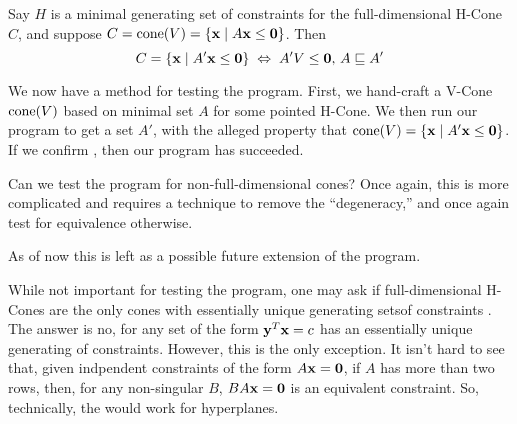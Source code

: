 \begin{EqCriteria}\label{eq_vc_hc}
	Say $H$ is a minimal generating set of constraints for the full-dimensional H-Cone $C$, and suppose $C = \operatorname{cone}(V) = \left\{\mathbf{x}\;|\; A\mathbf{x}\leq\mathbf{0}\right\}$.  Then
	\[ C = \left\{\mathbf{x}\;|\; A'\mathbf{x}\leq\mathbf{0}\right\} \;\Leftrightarrow\; A'V\leq\mathbf{0},\, A \sqsubseteq A' \]
\end{EqCriteria}

\begin{Test}\label{test_vc_to_hc}
	We now have a method for testing the program.  First, we hand-craft a V-Cone $\operatorname{cone}(V)$ based on minimal set $A$ for some pointed H-Cone. We then run our program to get a set $A'$, with the alleged property that $\operatorname{cone}(V) = \left\{\mathbf{x}\;|\; A'\mathbf{x}\leq\mathbf{0}\right\}$.  If we confirm , then our program has succeeded.
\end{Test}

\begin{Remark}
	Can we test the program for non-full-dimensional cones?  Once again, this is more complicated and requires a technique to remove the ``degeneracy,'' and once again test for equivalence otherwise.

	As of now this is left as a possible future extension of the program.
\end{Remark}

\begin{Remark}
	While not important for testing the program, one may ask if full-dimensional H-Cones are the only cones with essentially unique generating setsof constraints .  The answer is no, for any set of the form $\mathbf{y}^T \mathbf{x} = c$ has an essentially unique generating of constraints.  However, this is the only exception.  It isn't hard to see that, given indpendent constraints of the form $A\mathbf{x}=\mathbf{0}$, if $A$ has more than two rows, then, for any non-singular $B$, $BA\mathbf{x}=\mathbf{0}$ is an equivalent constraint.  So, technically, the  would work for hyperplanes.
\end{Remark}

